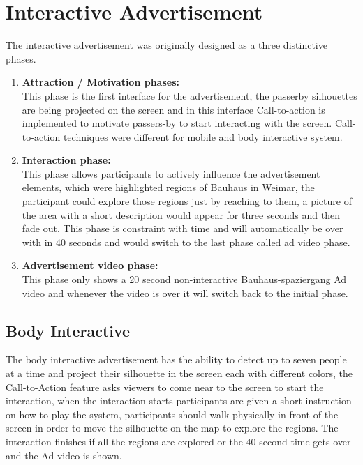\section{Interactive Advertisement}

The interactive advertisement was originally designed as a three distinctive phases.


\begin{enumerate}

\item \textbf{Attraction / Motivation phases:}\\ 
This phase is the first interface for the advertisement, the passerby silhouettes are being projected on the screen and in this interface Call-to-action is implemented to motivate passers-by to start interacting with the screen.
Call-to-action techniques were different for mobile and body interactive system.

\item \textbf{Interaction phase:} \\
This phase allows participants to actively influence the advertisement elements, which were highlighted regions of Bauhaus in Weimar, the participant could explore those regions just by reaching to them, a picture of the area with a short description would appear for three seconds and then fade out. This phase is constraint with time and will automatically be over with in 40 seconds and would switch to the last phase called ad video phase.

\item \textbf{Advertisement video phase:} \\
This phase only shows a 20 second non-interactive Bauhaus-spaziergang Ad video and whenever the video is over it will switch back to the initial phase.

\end{enumerate}

\subsection{Body Interactive}

The body interactive advertisement has the ability to detect up to seven people at a time and project their silhouette in the screen each with different colors, the Call-to-Action feature asks viewers to come near to the screen to start the interaction, when the interaction starts participants are given a short instruction on how to play the system, participants should walk physically in front of the screen in order to move the silhouette on the map to explore the regions. The interaction finishes if all the regions are explored or the 40 second time gets over and the Ad video is shown.


